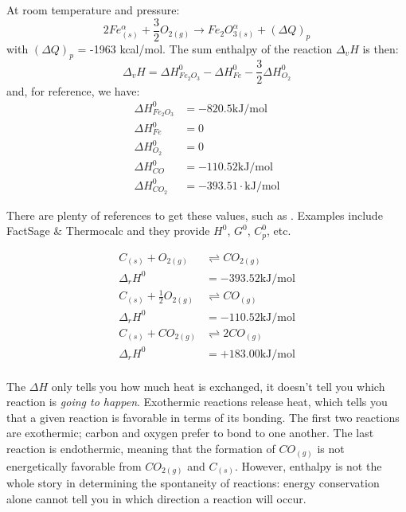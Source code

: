 \documentclass[12pt]{article}
\begin{document}
At room temperature and pressure:
\begin{equation}
2 Fe_{(s)}^{\alpha} + \frac{3}{2}O_{2 (g)} \rightarrow Fe_2O_{3 (s)}^{\alpha} + (\Delta Q)_p
\end{equation}
with $(\Delta Q)_p$ = -1963 kcal/mol.  The sum enthalpy of the reaction $\Delta_v H$ is then:
\begin{equation}
\Delta_v H = \Delta H^0_{Fe_2O_3} - \Delta H^0_{Fe} - \frac{3}{2} \Delta H^0_{O_2}
\end{equation}
and, for reference, we have:
\begin{align*}
\Delta H^0_{Fe_2O_3} &= -820.5 \text{kJ}/\text{mol}\\
\Delta H^0_{Fe} &= 0\\
\Delta H^0_{O_2} &= 0\\
\Delta H^0_{CO} &= -110.52 \text{kJ}/\text{mol}\\
\Delta H^0_{CO_2} &= -393.51 \cdot \text{kJ}/\text{mol}
\end{align*}

There are plenty of references to get these values, such as .  Examples include FactSage \& Thermocalc and they provide $H^0$, $G^0$, $C_p^0$, etc.

\begin{align*}
C_{(s)} + O_{2 (g)} &\rightleftharpoons CO_{2 (g)}\\
\Delta_r H^0 &= -393.52 \text{kJ}/\text{mol}\\
C_{(s)} + \frac{1}{2} O_{2 (g)} &\rightleftharpoons CO_{(g)}\\
\Delta_r H^0 &= -110.52 \text{kJ}/\text{mol}\\
C_{(s)} + CO_{2 (g)} &\rightleftharpoons 2 CO_{(g)}\\
\Delta_r H^0 &= +183.00 \text{kJ}/\text{mol}\\
\end{align*}

The $\Delta H$ only tells you how much heat is exchanged, it doesn't tell you which reaction is \emph{going to happen}. Exothermic reactions release heat, which tells you that a given reaction is favorable in terms of its bonding. The first two reactions are exothermic; carbon and oxygen prefer to bond to one another. The last reaction is endothermic, meaning that the formation of $CO_{(g)}$ is not energetically favorable from  $CO_{2 (g)}$ and $C_{(s)}$. However, enthalpy is not the whole story in determining the spontaneity of reactions: energy conservation alone cannot tell you in which direction a reaction will occur.
\end{document}

